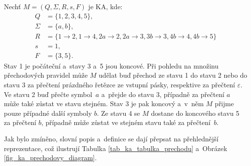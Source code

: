 \begin{example}\label{example_ka}
    Nechť $M = (Q, \Sigma, R, s, F)$ je KA, kde:
    \begin{align*}
        Q &= \{1, 2, 3, 4, 5\}, \\
        \Sigma &= \{a, b\}, \\
        R &= \{  1  \rightarrow 2, 1  \rightarrow 4,  2a \rightarrow 2, 2a \rightarrow 3, 3b \rightarrow 3, 4b \rightarrow 4, 4b \rightarrow 5\} \\
        s~&= 1, \\
        F &= \{3, 5\}.
    \end{align*}
    Stav 1 je počáteční a~stavy 3 a~5 jsou koncové.
    Při pohledu na množinu přechodových pravidel může $M$ udělat buď přechod ze stavu 1 do stavu 2 nebo do stavu 3 za přečtení prázdného řetězce ze vstupní pásky, respektive za přečtení $\varepsilon$. 
    Ve stavu 2 buď přečte symbol~$a$ a~přejde do stavu 3, případně za přečtení $a$ může také zůstat ve stavu stejném.
    Stav 3 je pak koncový a~v~něm $M$ přijme pouze případné další symboly $b$.
    Ze stavu 4 se $M$ dostane do koncového stavu 5 za přečtení $b$, případně může zůstat ve stejném stavu také za přečtení~$b$.
    
    Jak bylo zmíněno, slovní popis a~definice se dají přepsat na přehlednější reprezentace, což ilustrují Tabulka \ref{tab_ka_tabulka_prechodu} a~Obrázek \ref{fig_ka_prechodovy_diagram}. 


\end{example}
